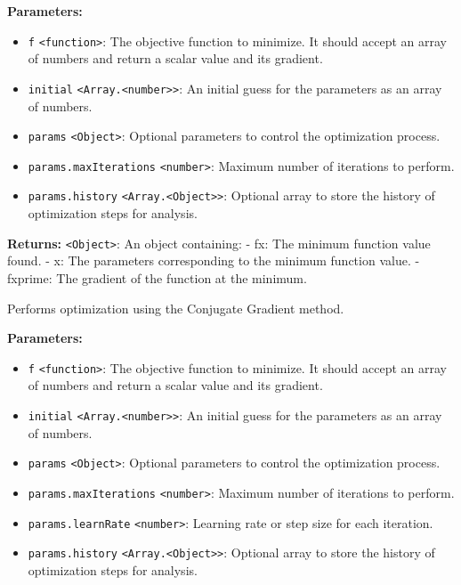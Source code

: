 \documentclass[12pt,a4paper]{article}
\begin{document}
\noindent \textbf{Parameters:}
\begin{itemize}
  \item \texttt{f} \texttt{<function>}: The objective function to minimize. It should accept an array of numbers and return a scalar value and its gradient.
  \item \texttt{initial} \texttt{<Array.<number>>}: An initial guess for the parameters as an array of numbers.
  \item \texttt{params} \texttt{<Object>}: Optional parameters to control the optimization process.
  \item \texttt{params.maxIterations} \texttt{<number>}: Maximum number of iterations to perform.
  \item \texttt{params.history} \texttt{<Array.<Object>>}: Optional array to store the history of optimization steps for analysis.
\end{itemize}

\noindent \textbf{Returns:} \texttt{<Object>}: An object containing:
- \textasciigrave{}fx\textasciigrave{}: The minimum function value found.
- \textasciigrave{}x\textasciigrave{}: The parameters corresponding to the minimum function value.
- \textasciigrave{}fxprime\textasciigrave{}: The gradient of the function at the minimum.

\noindent Performs optimization using the Conjugate Gradient method.

\vspace{5mm}
\noindent {}


\noindent \textbf{Parameters:}
\begin{itemize}
  \item \texttt{f} \texttt{<function>}: The objective function to minimize. It should accept an array of numbers and return a scalar value and its gradient.
  \item \texttt{initial} \texttt{<Array.<number>>}: An initial guess for the parameters as an array of numbers.
  \item \texttt{params} \texttt{<Object>}: Optional parameters to control the optimization process.
  \item \texttt{params.maxIterations} \texttt{<number>}: Maximum number of iterations to perform.
  \item \texttt{params.learnRate} \texttt{<number>}: Learning rate or step size for each iteration.
  \item \texttt{params.history} \texttt{<Array.<Object>>}: Optional array to store the history of optimization steps for analysis.
\end{itemize}
\end{document}
